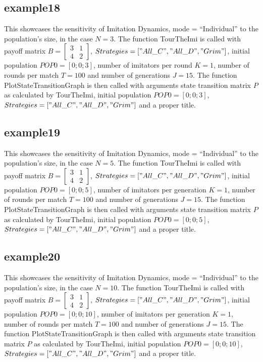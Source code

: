 \subsection{example18}
This showcases the sensitivity of Imitation Dynamics, mode = ``Individual'' to the population's size, in the case $N=3$. The function TourTheImi is called with payoff matrix $B = \begin{bmatrix} 3 & 1 \\ 4 & 2 \end{bmatrix}$, $Strategies = ["All\_C", "All\_D", "Grim"]$, initial population $POP0 = [0; 0; 3]$, number of imitators per round $K=1$, number of rounds per match $T = 100$ and number of generations $J = 15$. The function PlotStateTransitionGraph is then called with arguments state transition matrix $P$ as calculated by TourTheImi, initial population $POP0 = [0; 0; 3]$, $Strategies = ["All\_C", "All\_D", "Grim"]$ and a proper title.

\subsection{example19}
This showcases the sensitivity of Imitation Dynamics, mode = ``Individual'' to the population's size, in the case $N=5$. The function TourTheImi is called with payoff matrix $B = \begin{bmatrix} 3 & 1 \\ 4 & 2 \end{bmatrix}$, $Strategies = ["All\_C", "All\_D", "Grim"]$, initial population $POP0 = [0; 0; 5]$, number of imitators per generation $K=1$, number of rounds per match $T = 100$ and number of generations $J = 15$. The function PlotStateTransitionGraph is then called with arguments state transition matrix $P$ as calculated by TourTheImi, initial population $POP0 = [0; 0; 5]$, $Strategies = ["All\_C", "All\_D", "Grim"]$ and a proper title.

\subsection{example20}
This showcases the sensitivity of Imitation Dynamics, mode = ``Individual'' to the population's size, in the case $N=10$. The function TourTheImi is called with payoff matrix $B = \begin{bmatrix} 3 & 1 \\ 4 & 2 \end{bmatrix}$, $Strategies = ["All\_C", "All\_D", "Grim"]$, initial population $POP0 = [0; 0; 10]$, number of imitators per generation $K=1$, number of rounds per match $T = 100$ and number of generations $J = 15$. The function PlotStateTransitionGraph is then called with arguments state transition matrix $P$ as calculated by TourTheImi, initial population $POP0 = [0; 0; 10]$, $Strategies = ["All\_C", "All\_D", "Grim"]$ and a proper title.

